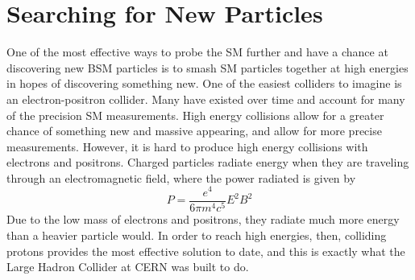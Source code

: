 \chapter{Searching for New Particles}\label{Sec:CMS}
One of the most effective ways to probe the SM further and have a chance at discovering new BSM particles is to smash SM particles together at high energies in hopes of discovering something new. One of the easiest colliders to imagine is an electron-positron collider. Many have existed over time and account for many of the precision SM measurements. High energy collisions allow for a greater chance of something new and massive appearing, and allow for more precise measurements. However, it is hard to produce high energy collisions with electrons and positrons. Charged particles radiate energy when they are traveling through an electromagnetic field, where the power radiated is given by
\begin{equation}\label{Eq:SynchRad}
   P = \frac{e^4}{6\pi m^4c^5}E^2B^2
\end{equation}
Due to the low mass of electrons and positrons, they radiate much more energy than a heavier particle would. In order to reach high energies, then, colliding protons provides the most effective solution to date, and this is exactly what the Large Hadron Collider at CERN was built to do.
\vspace{5mm}



